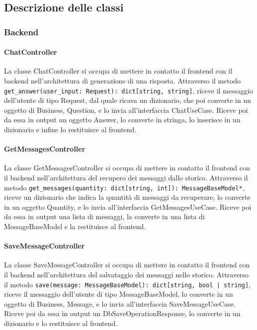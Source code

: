 \subsection{Descrizione delle classi}
\label{sec:descrizione_classi}

\subsubsection{Backend}
\label{sec:backend}

\label{sec:controller}

\paragraph{ChatController}
\label{sec:chat_controller}
La classe ChatController si occupa di mettere in contatto il frontend con il backend nell'architettura di generazione di una risposta. Attraverso il metodo \texttt{get\_answer(user\_input: Request): dict[string, string]}, riceve il messaggio dell'utente di tipo Request, dal quale ricava un dizionario, che poi converte in un oggetto di Business, Question, e lo invia all'interfaccia ChatUseCase. Riceve poi da essa in output un oggetto Answer, lo converte in stringa, lo inserisce in un dizionario e infine lo restituisce al frontend.

\paragraph{GetMessagesController}
\label{sec:get_messages_controller}
La classe GetMessagesController si occupa di mettere in contatto il frontend con il backend nell'architettura del recupero dei messaggi dallo storico. Attraverso il metodo \texttt{get\_messages(quantity: dict[string, int]): MessageBaseModel*}, riceve un dizionario che indica la quantità di messaggi da recuperare, lo converte in un oggetto Quantity, e lo invia all'interfaccia GetMessagesUseCase. Riceve poi da essa in output una lista di messaggi, la converte in una lista di MessageBaseModel e la restituisce al frontend.

\paragraph{SaveMessageController}
\label{sec:save_message_controller}
La classe SaveMessageController si occupa di mettere in contatto il frontend con il backend nell'architettura del salvataggio dei messaggi nello storico. Attraverso il metodo \texttt{save(message: MessageBaseModel): dict[string, bool | string]}, riceve il messaggio dell'utente di tipo MessageBaseModel, lo converte in un oggetto di Business, Message, e lo invia all'interfaccia SaveMessageUseCase. Riceve poi da essa in output un DbSaveOperationResponse, lo converte in un dizionario e lo restituisce al frontend.


